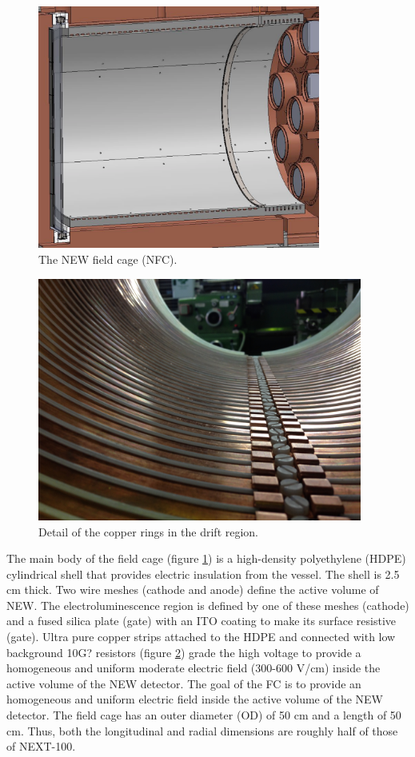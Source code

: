 \begin{figure}[hpt!]
\centering
\includegraphics[height=8cm]{img/NFC.pdf}
\caption{The NEW field cage (NFC).} \label{fig:NFC}
\end{figure}

\begin{figure}[hpt!]
\centering
\includegraphics[height=8cm]{FieldCage/img/IMG_0246.JPG}
\caption{Detail of the copper rings in the drift region.} \label{fig:drift1}
\end{figure}

The main body of the field cage (figure \ref{fig:NFC})  is a high-density polyethylene (HDPE) cylindrical shell that provides electric insulation from the vessel. The shell is 2.5 cm thick. Two wire meshes (cathode and anode) define the active volume of NEW. The electroluminescence region is defined by one of these meshes (cathode) and a fused silica plate (gate) with an ITO coating to make its surface resistive (gate). Ultra pure copper strips attached to the HDPE and connected with low background 10G? resistors (figure \ref{fig:drift1}) grade the high voltage to provide a homogeneous and uniform moderate electric field (300-600 V/cm) inside the active volume of the NEW detector.
The goal of the FC is to provide an homogeneous and uniform electric field inside the active volume of the NEW detector. The field cage has an outer diameter (OD) of 50 cm and a length of 50 cm. Thus, both the longitudinal and radial dimensions are roughly half of those of NEXT-100. 

